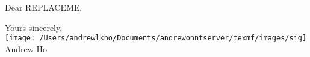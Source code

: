 \documentclass[a4paper,10pt]{article}
\begin{document}
\hfill
{}

Dear REPLACEME,



\vspace{\baselineskip}
Yours sincerely, \\
\texttt{[image: /Users/andrewlkho/Documents/andrewonntserver/texmf/images/sig]} \\
Andrew Ho
\end{document}

